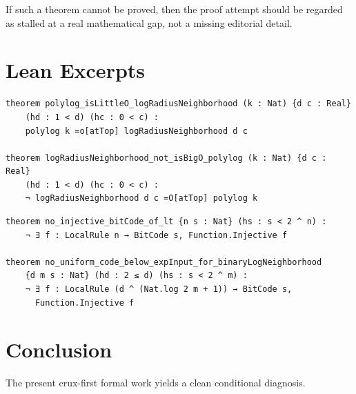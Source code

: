 \documentclass[11pt]{article}
\theoremstyle{remark}
\begin{document}
If such a theorem cannot be proved, then the proof attempt should be regarded as stalled at a real
mathematical gap, not a missing editorial detail.

\section{Lean Excerpts}

\begin{lstlisting}[caption={Core asymptotic obstruction}]
theorem polylog_isLittleO_logRadiusNeighborhood (k : Nat) {d c : Real}
    (hd : 1 < d) (hc : 0 < c) :
    polylog k =o[atTop] logRadiusNeighborhood d c

theorem logRadiusNeighborhood_not_isBigO_polylog (k : Nat) {d c : Real}
    (hd : 1 < d) (hc : 0 < c) :
    ¬ logRadiusNeighborhood d c =O[atTop] polylog k
\end{lstlisting}

\begin{lstlisting}[caption={Core counting obstruction}]
theorem no_injective_bitCode_of_lt {n s : Nat} (hs : s < 2 ^ n) :
    ¬ ∃ f : LocalRule n → BitCode s, Function.Injective f

theorem no_uniform_code_below_expInput_for_binaryLogNeighborhood
    {d m s : Nat} (hd : 2 ≤ d) (hs : s < 2 ^ m) :
    ¬ ∃ f : LocalRule (d ^ (Nat.log 2 m + 1)) → BitCode s,
      Function.Injective f
\end{lstlisting}

\section{Conclusion}

The present crux-first formal work yields a clean conditional diagnosis.
\end{document}
